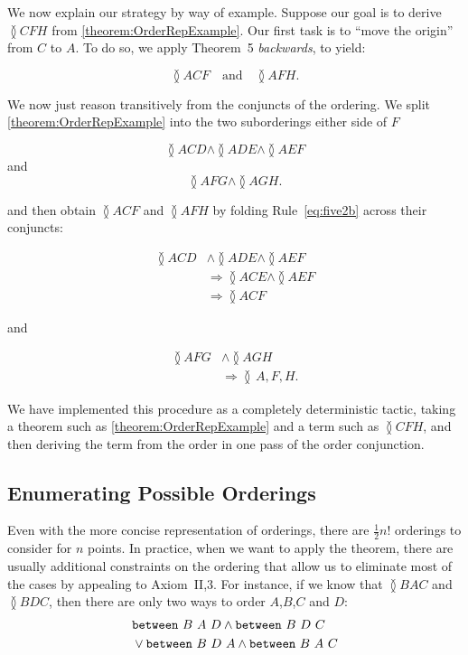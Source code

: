 We now explain our strategy by way of example. Suppose our goal is to derive $\between{C}{F}{H}$ from \eqref{theorem:OrderRepExample}. Our first task is to ``move the origin'' from $C$ to $A$. To do so, we apply Theorem~5 \emph{backwards}, to yield:

\begin{displaymath}
\between{A}{C}{F} \quad\text{and}\quad \between{A}{F}{H}.
\end{displaymath}

We now just reason transitively from the conjuncts of the ordering. We split \eqref{theorem:OrderRepExample} into the two suborderings either side of $F$

\begin{displaymath}
\between{A}{C}{D} \wedge \between{A}{D}{E} \wedge\between{A}{E}{F}
\end{displaymath}
and
\begin{displaymath}
\between{A}{F}{G}\wedge\between{A}{G}{H}.
\end{displaymath}

and then obtain $\between{A}{C}{F}$ and $\between{A}{F}{H}$ by folding Rule~\eqref{eq:five2b} across their conjuncts:

\begin{align*}
\between{A}{C}{D} &\wedge \between{A}{D}{E} \wedge\between{A}{E}{F}\\
&\Longrightarrow \between{A}{C}{E} \wedge \between{A}{E}{F}\\
&\Longrightarrow \between{A}{C}{F}
\end{align*}

and

\begin{align*}
\between{A}{F}{G} &\wedge \between{A}{G}{H}\\
&\Longrightarrow \between\,A,F,H.
\end{align*}

We have implemented this procedure as a completely deterministic tactic, taking a theorem such as \eqref{theorem:OrderRepExample} and a term such as $\between{C}{F}{H}$, and then deriving the term from the order in one pass of the order conjunction.

\subsection{Enumerating Possible Orderings}
Even with the more concise representation of orderings, there are $\frac{1}{2}n!$ orderings to consider for $n$ points. In practice, when we want to apply the theorem, there are usually additional constraints on the ordering that allow us to eliminate most of the cases by appealing to Axiom~II,3. For instance, if we know that $\between{B}{A}{C}$ and $\between{B}{D}{C}$, then there are only two ways to order $A$,$B$,$C$ and $D$:
\begin{align*}
&\texttt{between}\ B\ A\ D\wedge\texttt{between}\ B\ D\ C\\
&\vee\texttt{between}\ B\ D\ A\wedge\texttt{between}\ B\ A\ C
\end{align*}


